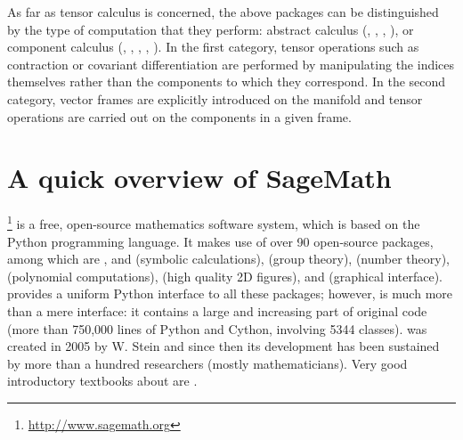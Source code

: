 As far as tensor calculus is concerned, the above packages can be distinguished by
the type of computation that they perform:
abstract calculus (, , , ),
or component calculus (, , ,
, ).
In the first category, tensor operations such as contraction or covariant differentiation
are performed by manipulating the indices themselves rather than the components
to which they correspond. In the second category, vector frames are explicitly
introduced on the manifold and tensor operations are carried out on the components
in a given frame.



\section{A quick overview of SageMath} \label{s:int:overview_Sage}

\Sage{}\footnote{\url{http://www.sagemath.org}} is a free, open-source mathematics software system, which is
based on the Python programming language. It makes use of over 90 open-source packages,
among which are ,  and  (symbolic calculations),
 (group theory),
 (number theory),  (polynomial computations),
 (high quality 2D figures), and  (graphical interface).
\Sage{} provides a uniform Python interface to all these packages; however,
\Sage{} is much more than a mere interface: it contains a large and increasing part of
original code (more than 750,000 lines of Python and Cython, involving 5344 classes).
\Sage{} was created in 2005 by W. Stein \cite{SteinJ05} and since
then its development has been sustained by more than a hundred researchers
(mostly mathematicians). Very good introductory textbooks about \Sage{} are
\cite{JoyneS14,Zimme13,Zimme18,Bard15}.

